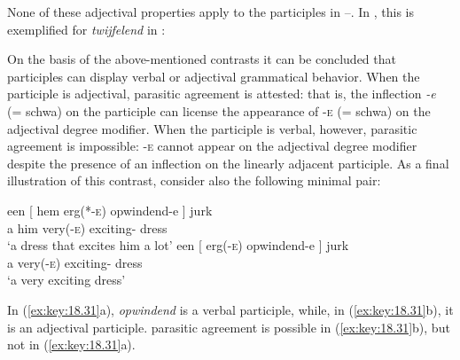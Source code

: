 \documentclass[output=paper]{langsci/langscibook}
\begin{document}
None of these adjectival properties apply to the participles in
--. In , this is exemplified for
\emph{twijfelend} in :

\ea%
    \label{ex:key:18.30}
	\z
\z

On the basis of the above-mentioned contrasts it can be concluded that
participles can display verbal or adjectival grammatical behavior. When the
participle is adjectival, parasitic agreement is attested: that is, the
inflection \emph{-e} (= schwa) on the participle can license the appearance of
\textsc{-e} (= schwa) on the adjectival degree modifier. When the participle is
verbal, however, parasitic agreement is impossible: -\textsc{e} cannot appear
on the adjectival degree modifier despite the presence of an inflection on the
linearly adjacent participle. As a final illustration of this contrast,
consider also the following minimal pair:

\ea%
    \label{ex:key:18.31}
	\ea
	\gll een   [ hem    erg(*-\textsc{e})  opwindend-e ]    jurk\\
    a      {}  him    very(-\textsc{e})    exciting-\Agr{} {} dress\\
	\glt \enquote*{a dress that excites him a lot}
	\ex
	\gll een   [ erg(-\textsc{e})    opwindend-e ]    jurk\\
    a    {}  very(-\textsc{e})    exciting-\Agr{} {}  dress\\
	\glt \enquote*{a very exciting dress}
	\z
\z

In (\ref{ex:key:18.31}a), \emph{opwindend} is a verbal participle, while, in
(\ref{ex:key:18.31}b), it is an adjectival participle. parasitic agreement is
possible in (\ref{ex:key:18.31}b), but not in (\ref{ex:key:18.31}a).
\end{document}
